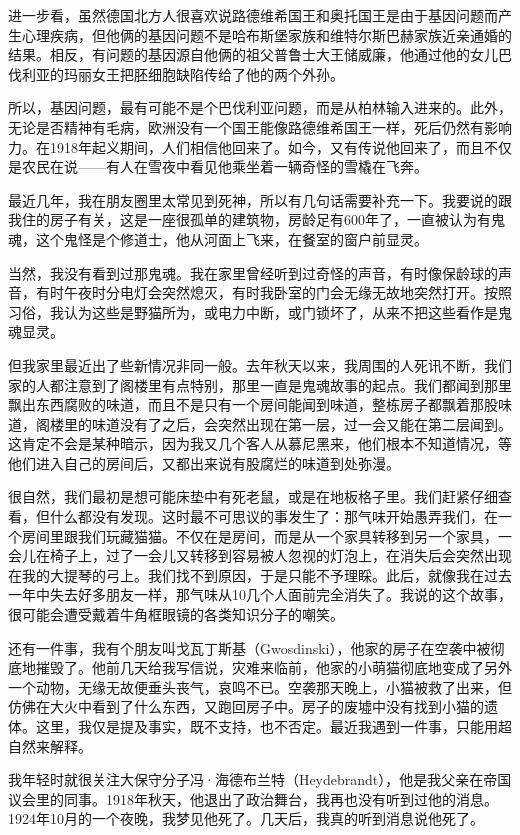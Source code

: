 \documentclass[UTF8]{ctexart}
\begin{document}
进一步看，虽然德国北方人很喜欢说路德维希国王和奥托国王是由于基因问题而产生心理疾病，但他俩的基因问题不是哈布斯堡家族和维特尔斯巴赫家族近亲通婚的结果。相反，有问题的基因源自他俩的祖父普鲁士大王储威廉，他通过他的女儿巴伐利亚的玛丽女王把胚细胞缺陷传给了他的两个外孙。

所以，基因问题，最有可能不是个巴伐利亚问题，而是从柏林输入进来的。此外，无论是否精神有毛病，欧洲没有一个国王能像路德维希国王一样，死后仍然有影响力。在1918年起义期间，人们相信他回来了。如今，又有传说他回来了，而且不仅是农民在说——有人在雪夜中看见他乘坐着一辆奇怪的雪橇在飞奔。

最近几年，我在朋友圈里太常见到死神，所以有几句话需要补充一下。我要说的跟我住的房子有关，这是一座很孤单的建筑物，房龄足有600年了，一直被认为有鬼魂，这个鬼怪是个修道士，他从河面上飞来，在餐室的窗户前显灵。

当然，我没有看到过那鬼魂。我在家里曾经听到过奇怪的声音，有时像保龄球的声音，有时午夜时分电灯会突然熄灭，有时我卧室的门会无缘无故地突然打开。按照习俗，我认为这些是野猫所为，或电力中断，或门锁坏了，从来不把这些看作是鬼魂显灵。

但我家里最近出了些新情况非同一般。去年秋天以来，我周围的人死讯不断，我们家的人都注意到了阁楼里有点特别，那里一直是鬼魂故事的起点。我们都闻到那里飘出东西腐败的味道，而且不是只有一个房间能闻到味道，整栋房子都飘着那股味道，阁楼里的味道没有了之后，会突然出现在第一层，过一会又能在第二层闻到。这肯定不会是某种暗示，因为我又几个客人从慕尼黑来，他们根本不知道情况，等他们进入自己的房间后，又都出来说有股腐烂的味道到处弥漫。

很自然，我们最初是想可能床垫中有死老鼠，或是在地板格子里。我们赶紧仔细查看，但什么都没有发现。这时最不可思议的事发生了：那气味开始愚弄我们，在一个房间里跟我们玩藏猫猫。不仅在是房间，而是从一个家具转移到另一个家具，一会儿在椅子上，过了一会儿又转移到容易被人忽视的灯泡上，在消失后会突然出现在我的大提琴的弓上。我们找不到原因，于是只能不予理睬。此后，就像我在过去一年中失去好多朋友一样，那气味从10几个人面前完全消失了。我说的这个故事，很可能会遭受戴着牛角框眼镜的各类知识分子的嘲笑。

还有一件事，我有个朋友叫戈瓦丁斯基（Gwosdinski），他家的房子在空袭中被彻底地摧毁了。他前几天给我写信说，灾难来临前，他家的小萌猫彻底地变成了另外一个动物，无缘无故便垂头丧气，哀鸣不已。空袭那天晚上，小猫被救了出来，但仿佛在大火中看到了什么东西，又跑回房子中。房子的废墟中没有找到小猫的遗体。这里，我仅是提及事实，既不支持，也不否定。最近我遇到一件事，只能用超自然来解释。

我年轻时就很关注大保守分子冯·海德布兰特（Heydebrandt），他是我父亲在帝国议会里的同事。1918年秋天，他退出了政治舞台，我再也没有听到过他的消息。1924年10月的一个夜晚，我梦见他死了。几天后，我真的听到消息说他死了。
\end{document}
